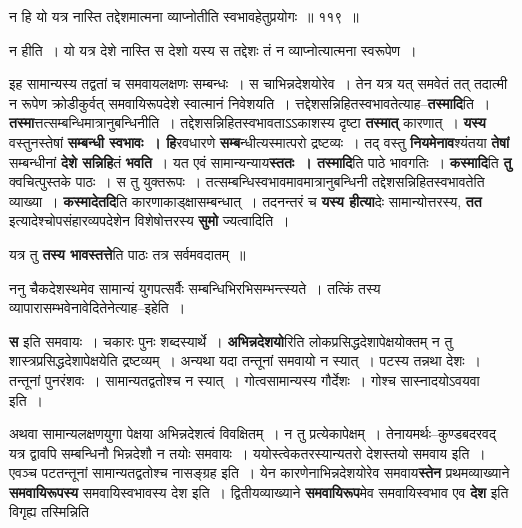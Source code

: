 \documentclass[article,12pt,a4paper]{memoir}
\begin{document}
	न हि यो यत्र नास्ति तद्देशमात्मना व्याप्नोतीति स्वभावहेतुप्रयोगः ॥ ११९ ॥ 
	  
	न हीति । यो यत्र देशे नास्ति स देशो यस्य स तद्देशः तं न व्याप्नोत्यात्मना स्वरूपेण ।  
	  
	इह सामान्यस्य तद्वतां च समवायलक्षणः सम्बन्धः । स चाभिन्नदेशयोरेव । तेन यत्र यत् समवेतं तत् तदात्मी न रूपेण क्रोडीकुर्वत् समवायिरूपदेशे स्वात्मानं निवेशयति । त्तद्देशसन्निहितस्वभावतेत्याह--\textbf{तस्मादि}ति । \textbf{तस्मा}त्तत्सम्बन्धिमात्रानुबन्धिनीति । तद्देशसन्निहितस्वभावताऽऽकाशस्य दृष्टा \textbf{तस्मात्} कारणात् । \textbf{यस्य} वस्तुनस्तेषां \textbf{ सम्बन्धी स्वभावः । हि}रवधारणे \textbf{सम्ब}न्धीत्यस्मात्परो द्रष्टव्यः । तद् वस्तु \textbf{नियमेनाव}श्यंतया \textbf{तेषां} सम्बन्धीनां \textbf{देशे सन्निहि}तं \textbf{भवति} । यत एवं सामान्यन्याय\textbf{स्ततः । तस्मादि}ति पाठे भावगतिः । \textbf{कस्मादि}ति \textbf{तु} क्वचित्पुस्तके पाठः । स तु युक्तरूपः । तत्सम्बन्धिस्वभावमावमात्रानुबन्धिनी तद्देशसन्निहितस्वभावतेति व्याख्या । \textbf{कस्मादेतदि}ति कारणाकाड्क्षासम्बन्धात् । तदनन्तरं च \textbf{यस्य हीत्या}देः सामान्योत्तरस्य, \textbf{तत} इत्यादेश्चोपसंहारव्यपदेशेन विशेषोत्तरस्य \textbf{सुमो}  ज्यत्वादिति ।
	\pend
      

	  \pstart यत्र तु \textbf{तस्य भावस्तत्ते}ति पाठः तत्र सर्वमवदातम् ॥
	\pend
      

	  \pstart ननु चैकदेशस्थमेव सामान्यं युगपत्सर्वैः सम्बन्धिभिरभिसम्भन्त्स्यते । तत्किं तस्य व्यापारासम्भवेनावेदितेनेत्याह--इहेति ।
	\pend
      

	  \pstart \textbf{स} इति समवायः । चकारः पुनः शब्दस्यार्थे । \textbf{अभिन्नदेशयो}रिति लोकप्रसिद्धदेशापेक्षयोक्तम् न तु शास्त्रप्रसिद्धदेशापेक्षयेति द्रष्टव्यम् । अन्यथा यदा  तन्तूनां समवायो न स्यात् । पटस्य तन्नथा  देशः । तन्तूनां पुनरंशवः । सामान्यतद्वतोश्च न स्यात् । गोत्वसामान्यस्य गौर्देशः । गोश्च सास्नादयोऽवयवा इति ।
	\pend
      

	  \pstart अथवा सामान्यलक्षणयुगा  पेक्षया अभिन्नदेशत्वं विवक्षितम् । न तु प्रत्येकापेक्षम् । तेनायमर्थः--कुण्डबदरवद् यत्र द्वावपि सम्बन्धिनौ भिन्नदेशौ न तयोः समवायः । ययोस्त्वेकतरस्यान्यतरो देशस्तयो समवाय इति । एवञ्च पटतन्तूनां सामान्यतद्वतोश्च नासङ्ग्रह इति । येन कारणेनाभिन्नदेशयोरेव समवाय\textbf{स्तेन} प्रथमव्याख्याने \textbf{समवायिरूपस्य} समवायिस्वभावस्य देश इति । द्वितीयव्याख्याने \textbf{समवायिरूप}मेव समवायिस्वभाव एव \textbf{देश} इति विगृह्य तस्मिन्निति  \leavevmode{} 
	  
\end{document}
